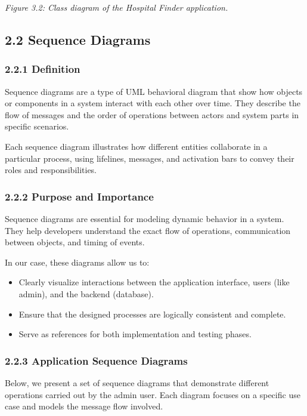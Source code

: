 \documentclass[12pt]{report}
\begin{document}
\textit{Figure 3.2: Class diagram of the Hospital Finder application.}

\subsection*{2.2 Sequence Diagrams}

\subsubsection{2.2.1 Definition}
Sequence diagrams are a type of UML behavioral diagram that show how objects or components in a system interact with each other over time. They describe the flow of messages and the order of operations between actors and system parts in specific scenarios.

Each sequence diagram illustrates how different entities collaborate in a particular process, using lifelines, messages, and activation bars to convey their roles and responsibilities.

\subsubsection*{2.2.2 Purpose and Importance}
Sequence diagrams are essential for modeling dynamic behavior in a system. They help developers understand the exact flow of operations, communication between objects, and timing of events.

In our case, these diagrams allow us to:
\begin{itemize}
    \item Clearly visualize interactions between the application interface, users (like admin), and the backend (database).
    \item Ensure that the designed processes are logically consistent and complete.
    \item Serve as references for both implementation and testing phases.
\end{itemize}

\subsubsection*{2.2.3 Application Sequence Diagrams}
Below, we present a set of sequence diagrams that demonstrate different operations carried out by the admin user. Each diagram focuses on a specific use case and models the message flow involved.

\vspace{1em}
\end{document}
